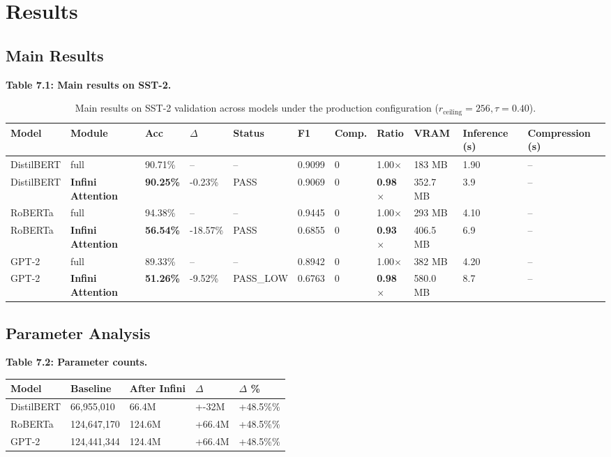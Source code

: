 
\section{Results}

\subsection{Main Results}

\textbf{Table 7.1: Main results on SST-2.}

\begin{table}[t]
\centering
\small
\begin{tabular}{lllllllllll}
\toprule
\textbf{Model} & \textbf{Module} & \textbf{Acc} & \textbf{$\Delta$} & \textbf{Status} & \textbf{F1} & \textbf{Comp.} & \textbf{Ratio} & \textbf{VRAM} & \textbf{Inference (s)} & \textbf{Compression (s)} \\
\midrule
DistilBERT & full & 90.71\% & -- & -- & 0.9099 & 0 & 1.00$\times$ & 183 MB & 1.90 & -- \\
DistilBERT & \textbf{Infini Attention} & \textbf{90.25\%} & -0.23\% & PASS & 0.9069 & 0 & \textbf{0.98$\times$} & 352.7 MB & 3.9 & -- \\
RoBERTa & full & 94.38\% & -- & -- & 0.9445 & 0 & 1.00$\times$ & 293 MB & 4.10 & -- \\
RoBERTa & \textbf{Infini Attention} & \textbf{56.54\%} & -18.57\% & PASS & 0.6855 & 0 & \textbf{0.93$\times$} & 406.5 MB & 6.9 & -- \\
GPT-2 & full & 89.33\% & -- & -- & 0.8942 & 0 & 1.00$\times$ & 382 MB & 4.20 & -- \\
GPT-2 & \textbf{Infini Attention} & \textbf{51.26\%} & -9.52\% & PASS_LOW & 0.6763 & 0 & \textbf{0.98$\times$} & 580.0 MB & 8.7 & -- \\
\bottomrule
\end{tabular}
\caption{Main results on SST-2 validation across models under the production configuration ($r_{\mathrm{ceiling}}=256, \tau=0.40$).}
\label{tab:main_sst2}
\end{table}

\subsection{Parameter Analysis}

\textbf{Table 7.2: Parameter counts.}

\begin{table}[H]
\centering
\small
\begin{tabular}{lllll}
\toprule
\textbf{Model} & \textbf{Baseline} & \textbf{After Infini} & \textbf{$\Delta$} & \textbf{$\Delta$ \%} \\
\midrule
DistilBERT & 66,955,010 & 66.4M & +-32M & +48.5\%\% \\
RoBERTa & 124,647,170 & 124.6M & +66.4M & +48.5\%\% \\
GPT-2 & 124,441,344 & 124.4M & +66.4M & +48.5\%\% \\
\bottomrule
\end{tabular}
\end{table}

